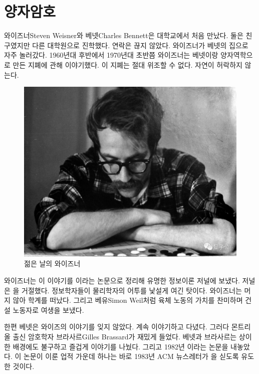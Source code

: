 \documentclass[a4paper,chapter,atbegshi]{oblivoir}
\begin{document}
\chapter{양자암호}
와이즈너{\tiny Steven Weisner}와 베넷{\tiny Charles Bennett}은 대학교에서
처음 만났다. 둘은 친구였지만 다른 대학원으로 진학했다. 연락은 끊지
않았다. 와이즈너가 베넷의 집으로 자주 놀러갔다. 1960년대 후반에서
1970년대 초반쯤 와이즈너는 베넷이랑 양자역학으로 만든 지폐에 관해
이야기했다. 이 지폐는 절대 위조할 수 없다. 자연이 허락하지 않는다. 
\begin{figure}[h]\centering
  \includegraphics[scale=0.2]{weizner}
  \caption{젊은 날의 와이즈너}
\end{figure}

\noindent
와이즈너는 이 이야기를 이라는 논문으로
정리해 유명한 정보이론 저널에 보냈다. 저널은 을 거절했다.
정보학자들이 물리학자의 어투를 낯설게 여긴 탓이다. 와이즈너는 머지 않아 학계를
떠났다. 그리고 베유{\tiny Simon Weil}처럼 육체 노동의 가치를 찬미하며 건설
노동자로 여생을 보냈다.

한편 베넷은 와이즈의 이야기를 잊지 않았다. 계속 이야기하고 다녔다. 그러다 
몬트리올 출신 암호학자 브라사르{\tiny Gilles Brassard}가 재밌게 들었다. 
베넷과 브라사르는 상이한 배경에도 불구하고 즐겁게 이야기를 나눴다. 
그리고 1982년 이라는 논문을 내놓았다. 
이 논문이 이룬 업적 가운데 하나는 바로 1983년 ACM 뉴스레터가 을
싣도록 유도한 것이다. 
\end{document}

